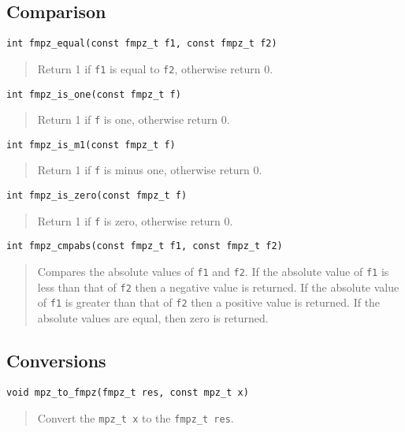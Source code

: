 \documentclass[a4paper,10pt]{article}
\newcommand{\code}{\lstinline}
\begin{document}
\subsection{Comparison}

\begin{lstlisting}
int fmpz_equal(const fmpz_t f1, const fmpz_t f2)
\end{lstlisting}
\begin{quote}
Return 1 if \code{f1} is equal to \code{f2}, otherwise return 0.
\end{quote}

\begin{lstlisting}
int fmpz_is_one(const fmpz_t f)
\end{lstlisting}
\begin{quote}
Return 1 if \code{f} is one, otherwise return 0.
\end{quote}

\begin{lstlisting}
int fmpz_is_m1(const fmpz_t f)
\end{lstlisting}
\begin{quote}
Return 1 if \code{f} is minus one, otherwise return 0.
\end{quote}

\begin{lstlisting}
int fmpz_is_zero(const fmpz_t f)
\end{lstlisting}
\begin{quote}
Return 1 if \code{f} is zero, otherwise return 0.
\end{quote}

\begin{lstlisting}
int fmpz_cmpabs(const fmpz_t f1, const fmpz_t f2)
\end{lstlisting}
\begin{quote}
Compares the absolute values of \code{f1} and \code{f2}. If the absolute value of \code{f1} is less than that of \code{f2} then a negative value is returned. If the absolute value of \code{f1} is greater than that of \code{f2} then a positive value is returned. If the absolute values are equal, then zero is returned. 
\end{quote}

\subsection{Conversions}

\begin{lstlisting}
void mpz_to_fmpz(fmpz_t res, const mpz_t x)
\end{lstlisting}
\begin{quote}
Convert the \code{mpz_t x} to the \code{fmpz_t res}. 
\end{quote}
\end{document}
